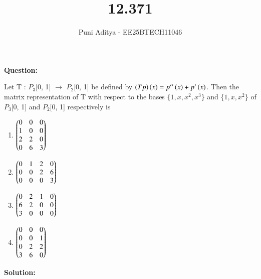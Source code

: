 \documentclass[journal]{IEEEtran}
\begin{document}
\title{12.371}
\author{Puni Aditya - EE25BTECH11046}
\maketitle

\textbf{Question:}

Let T : $P_3$[0, 1] $\to$ $P_2$[0, 1] be defined by $\left(T p\right)\left(x\right) = p''\left(x\right) + p'\left(x\right)$. Then the matrix
representation of T with respect to the bases $\{1, x, x^2, x^3 \}$ and $\{1, x, x^2 \}$ of $P_3$[0, 1]
and $P_2$[0, 1] respectively is
\begin{enumerate}
    \item $\begin{pmatrix}0 & 0 & 0 \\ 1 & 0 & 0 \\ 2 & 2 & 0 \\ 0 & 6 & 3\end{pmatrix}$
    \item $\begin{pmatrix}0 & 1 & 2 & 0 \\ 0 & 0 & 2 & 6 \\ 0 & 0 & 0 & 3\end{pmatrix}$
    \item $\begin{pmatrix}0 & 2 & 1 & 0 \\ 6 & 2 & 0 & 0 \\ 3 & 0 & 0 & 0\end{pmatrix}$
    \item $\begin{pmatrix}0 & 0 & 0 \\ 0 & 0 & 1 \\ 0 & 2 & 2 \\ 3 & 6 & 0\end{pmatrix}$
\end{enumerate}

\textbf{Solution:}
\end{document}
